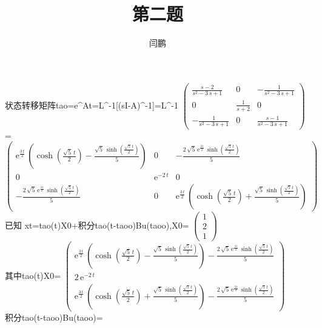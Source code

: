 \documentclass[a4paper]{article}
\begin{document}
\title{第二题}
\author{闫鹏}
\date{}
\maketitle
状态转移矩阵tao=e^At=L^-1[(sI-A)^-1]=L^-1 $\left(\begin{array}{ccc} \frac{s - 2}{s^2 - 3\, s + 1} & 0 & -\frac{1}{s^2 - 3\, s + 1}\\ 0 & \frac{1}{s + 2} & 0\\ -\frac{1}{s^2 - 3\, s + 1} & 0 & \frac{s - 1}{s^2 - 3\, s + 1} \end{array}\right)$
\\
 =$ \left(\begin{array}{ccc} \mathrm{e}^{\frac{3\, t}{2}}\, \left(\cosh\!\left(\frac{\sqrt{5}\, t}{2}\right) - \frac{\sqrt{5}\, \sinh\!\left(\frac{\sqrt{5}\, t}{2}\right)}{5}\right) & 0 & -\frac{2\, \sqrt{5}\, \mathrm{e}^{\frac{3\, t}{2}}\, \sinh\!\left(\frac{\sqrt{5}\, t}{2}\right)}{5}\\ 0 & \mathrm{e}^{- 2\, t} & 0\\ -\frac{2\, \sqrt{5}\, \mathrm{e}^{\frac{3\, t}{2}}\, \sinh\!\left(\frac{\sqrt{5}\, t}{2}\right)}{5} & 0 & \mathrm{e}^{\frac{3\, t}{2}}\, \left(\cosh\!\left(\frac{\sqrt{5}\, t}{2}\right) + \frac{\sqrt{5}\, \sinh\!\left(\frac{\sqrt{5}\, t}{2}\right)}{5}\right) \end{array}\right)$\\
已知 xt=tao(t)X0+积分tao(t-taoo)Bu(taoo),X0= $\left(\begin{array}{c} 1\\ 2\\ 1 \end{array}\right)$
\\其中tao(t)X0=
$\left(\begin{array}{c} \mathrm{e}^{\frac{3\, t}{2}}\, \left(\cosh\!\left(\frac{\sqrt{5}\, t}{2}\right) - \frac{\sqrt{5}\, \sinh\!\left(\frac{\sqrt{5}\, t}{2}\right)}{5}\right) - \frac{2\, \sqrt{5}\, \mathrm{e}^{\frac{3\, t}{2}}\, \sinh\!\left(\frac{\sqrt{5}\, t}{2}\right)}{5}\\ 2\, \mathrm{e}^{- 2\, t}\\ \mathrm{e}^{\frac{3\, t}{2}}\, \left(\cosh\!\left(\frac{\sqrt{5}\, t}{2}\right) + \frac{\sqrt{5}\, \sinh\!\left(\frac{\sqrt{5}\, t}{2}\right)}{5}\right) - \frac{2\, \sqrt{5}\, \mathrm{e}^{\frac{3\, t}{2}}\, \sinh\!\left(\frac{\sqrt{5}\, t}{2}\right)}{5} \end{array}\right)
$
\\
积分tao(t-taoo)Bu(taoo)=\\
\end{document}
